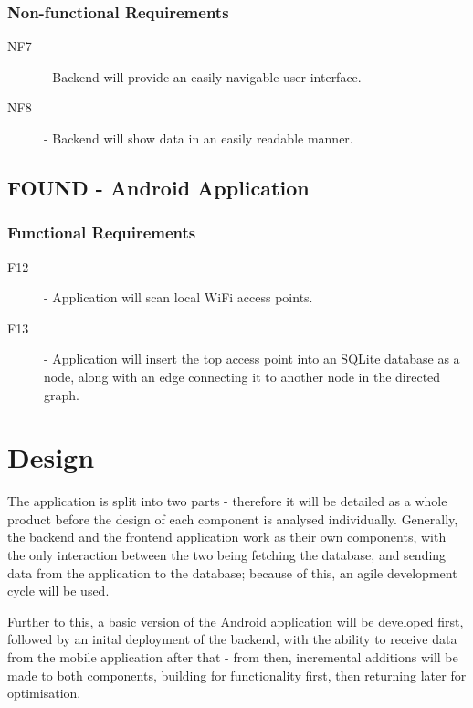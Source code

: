 \documentclass[11pt]{informatics-report}
\begin{document}
\subsection{Non-functional Requirements}

\begin{description}
\item[NF7] - Backend will provide an easily navigable user interface.
\item[NF8] - Backend will show data in an easily readable manner.
\end{description}

\section{FOUND - Android Application}

\subsection{Functional Requirements}

\begin{description}
\item[F12] - Application will scan local WiFi access points.
\item[F13] - Application will insert the top access point into an SQLite database as a node, along with an edge connecting it to another node in the directed graph.
\end{description}

\chapter{Design}
The application is split into two parts - therefore it will be detailed as a whole product before the design of each component is analysed individually. Generally, the backend and the frontend application work as their own components, with the only interaction between the two being fetching the database, and sending data from the application to the database; because of this, an agile development cycle will be used. 

Further to this, a basic version of the Android application will be developed first, followed by an inital deployment of the backend, with the ability to receive data from the mobile application after that - from then, incremental additions will be made to both components, building for functionality first, then returning later for optimisation. 
\newpage
\end{document}
